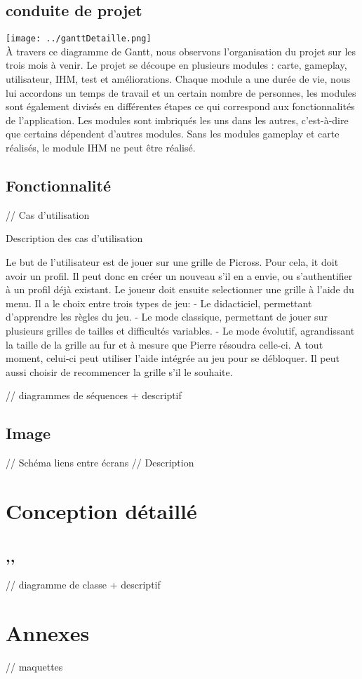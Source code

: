 \documentclass{report}
\begin{document}
    \section{conduite de projet}
    \texttt{[image: ../ganttDetaille.png]}
    \\
     À travers ce diagramme de Gantt, nous observons l'organisation du projet sur les trois mois à venir. Le projet se découpe en plusieurs modules : carte, gameplay, utilisateur, IHM, test et améliorations.
    Chaque module a une durée de vie, nous lui accordons un temps de travail et un certain nombre de personnes, les modules sont également divisés en différentes étapes ce qui correspond aux fonctionnalités de l'application. Les modules sont imbriqués les uns dans les autres, c'est-à-dire que certains dépendent d'autres modules. Sans les modules gameplay et carte réalisés, le module IHM ne peut être réalisé. 
    
    \section{Fonctionnalité}
      // Cas d'utilisation 
      
      Description des cas d'utilisation

Le but de l'utilisateur est de jouer sur une grille de Picross.
Pour cela, it doit avoir un profil. Il peut donc en créer un nouveau s'il en a envie, ou s'authentifier à un profil déjà existant.
Le joueur doit ensuite selectionner une grille à l'aide du menu. Il a le choix entre trois types de jeu:
	- Le didacticiel, permettant d'apprendre les règles du jeu. 
	- Le mode classique, permettant de jouer sur plusieurs grilles de tailles et difficultés variables.
	- Le mode évolutif, agrandissant la taille de la grille au fur et à mesure que Pierre résoudra celle-ci.
A tout moment, celui-ci peut utiliser l'aide intégrée au jeu pour se débloquer. Il peut aussi choisir de recommencer la grille s'il le souhaite.

      // diagrammes de séquences + descriptif 
    
		\section{Image}
			// Schéma liens entre écrans
			// Description
			
\chapter{Conception détaillé}

    \section{ ,, }
      // diagramme de classe + descriptif

    
\chapter{Annexes}

      // maquettes
\end{document}
